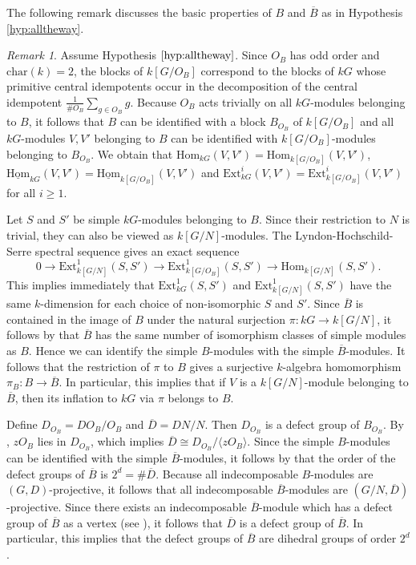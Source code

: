 \documentclass{amsart}
\theoremstyle{plain}
\theoremstyle{definition}
\theoremstyle{remark}
\newtheorem{rem}[thm]{Remark}
\begin{document}
The following remark discusses the basic properties of $B$ and $\overline{B}$ as in Hypothesis 
\ref{hyp:alltheway}.

\begin{rem}
\label{rem:trythis}
Assume Hypothesis $\ref{hyp:alltheway}$.
Since $O_B$ has odd order and $\mathrm{char}(k)=2$, the blocks of $k[G/O_B]$
correspond to the blocks of $kG$ whose primitive central
idempotents occur in the decomposition of the central idempotent $\frac{1}{\#O_B}
\sum_{g\in O_B}g$. Because $O_B$ acts trivially on all $kG$-modules belonging to $B$,
it follows that $B$ can be identified with a block $B_{O_B}$ of $k[G/O_B]$ and 
all $kG$-modules $V,V'$ belonging to $B$ can be identified with $k[G/O_B]$-modules belonging 
to $B_{O_B}$. We obtain that $\mathrm{Hom}_{kG}(V,V') = \mathrm{Hom}_{k[G/O_B]}(V,V')$,
$\underline{\mathrm{Hom}}_{kG}(V,V') =\underline{ \mathrm{Hom}}_{k[G/O_B]}(V,V')$
and $\mathrm{Ext}^i_{kG}(V,V')=\mathrm{Ext}^i_{k[G/O_B]}(V,V')$ for all $i\ge 1$.

Let $S$ and $S'$ be simple $kG$-modules belonging to $B$. Since their restriction to $N$ is trivial,
they can also be viewed as $k[G/N]$-modules. The Lyndon-Hochschild-Serre spectral sequence 
gives an exact sequence
$$0\to \mathrm{Ext}^1_{k[G/N]}(S,S')\to \mathrm{Ext}^1_{k[G/O_B]}(S,S') \to \mathrm{Hom}_{k[G/N]}
(S,S').$$
This implies immediately that $\mathrm{Ext}^1_{kG}(S,S')$ and $\mathrm{Ext}^1_{k[G/N]}(S,S')$ have 
the same $k$-dimension for each choice of non-isomorphic $S$ and $S'$. Since $\overline{B}$ is contained
in the image of $B$ under the natural surjection  $\pi:kG\to k[G/N]$, it follows by \cite[Prop. 13.3]{alp}
that $\overline{B}$ has the same number of isomorphism classes of simple modules as $B$.
Hence we can identify the simple $B$-modules with the simple $\overline{B}$-modules. 
It follows that the restriction of $\pi$ to $B$ gives a surjective $k$-algebra
homomorphism $\pi_B:B\to \overline{B}$. In particular, this implies that if $V$ is a $k[G/N]$-module
belonging to $\overline{B}$, then its inflation to $kG$ via $\pi$ belongs to $B$.

Define $D_{O_B}=DO_B/O_B$ and $\overline{D}=DN/N$. 
Then $D_{O_B}$ is a defect group of $B_{O_B}$. By \cite[Thm. 13.6]{alp}, $zO_B$ lies in $D_{O_B}$,
which implies $\overline{D}\cong D_{O_B}/\langle z O_B\rangle$.
Since the simple $B$-modules can be identified with the simple $\overline{B}$-modules, it follows 
by \cite[Prop. (56.32)]{CR} that the order of the defect groups of $\overline{B}$ is 
$2^d=\# \overline{D}$. Because all indecomposable $B$-modules are $(G,D)$-projective, it follows that all
indecomposable $\overline{B}$-modules are $(G/N,\overline{D})$-projective. Since there
exists an indecomposable $\overline{B}$-module which has a defect group of $\overline{B}$ as a vertex
(see \cite[Thm. (59.10)]{CR}), it follows that $\overline{D}$ is a defect group of $\overline{B}$.
In particular, this implies that the defect groups of $\overline{B}$ are dihedral groups of order $2^d$.
\end{rem}
\end{document}
